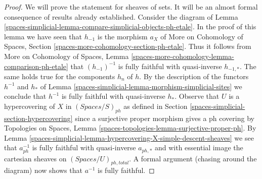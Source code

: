 \begin{proof}
We will prove the statement for sheaves of sets. It will be an
almost formal consequence of results already established.
Consider the diagram of
Lemma \ref{spaces-simplicial-lemma-compare-simplicial-objects-ph-etale}.
In the proof of this lemma we have seen that
$h_{-1}$ is the morphism $a_X$ of
More on Cohomology of Spaces, Section
\ref{spaces-more-cohomology-section-ph-etale}.
Thus it follows from
More on Cohomology of Spaces, Lemma
\ref{spaces-more-cohomology-lemma-comparison-ph-etale}
that $(h_{-1})^{-1}$ is fully faithful with quasi-inverse $h_{-1, *}$.
The same holds true for the components $h_n$ of $h$.
By the description of the functors $h^{-1}$ and $h_*$ of
Lemma \ref{spaces-simplicial-lemma-morphism-simplicial-sites}
we conclude that $h^{-1}$ is fully faithful with quasi-inverse $h_*$.
Observe that $U$ is a hypercovering of $X$ in $(\textit{Spaces}/S)_{ph}$
as defined in Section \ref{spaces-simplicial-section-hypercovering} since a surjective
proper morphism gives a ph covering by Topologies on Spaces, Lemma
\ref{spaces-topologies-lemma-surjective-proper-ph}.
By Lemma \ref{spaces-simplicial-lemma-hypercovering-X-simple-descent-sheaves}
we see that $a_{ph}^{-1}$ is fully faithful with quasi-inverse
$a_{ph, *}$ and with essential image the cartesian sheaves
on $(\textit{Spaces}/U)_{ph, total}$.
A formal argument (chasing around the diagram) now shows that
$a^{-1}$ is fully faithful.


\end{proof}
